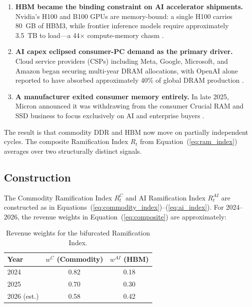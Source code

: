 \documentclass[12pt]{article}
\theoremstyle{definition}
\begin{document}
\begin{enumerate}[itemsep=4pt]
\item \textbf{HBM became the binding constraint on AI accelerator shipments.} Nvidia's H100 and B100 GPUs are memory-bound: a single H100 carries 80~GB of HBM3, while frontier inference models require approximately 3.5~TB to load---a 44$\times$ compute-memory chasm \cite{WakilPhotonic2026}.

\item \textbf{AI capex eclipsed consumer-PC demand as the primary driver.} Cloud service providers (CSPs) including Meta, Google, Microsoft, and Amazon began securing multi-year DRAM allocations, with OpenAI alone reported to have absorbed approximately 40\% of global DRAM production \cite{ColdFusion2026}.

\item \textbf{A manufacturer exited consumer memory entirely.} In late 2025, Micron announced it was withdrawing from the consumer Crucial RAM and SSD business to focus exclusively on AI and enterprise buyers \cite{ColdFusion2026}.
\end{enumerate}

The result is that commodity DDR and HBM now move on partially independent cycles. The composite Ramification Index $R_t$ from Equation~(\ref{eq:ram_index}) averages over two structurally distinct signals.

\subsection{Construction}

The Commodity Ramification Index $R_t^C$ and AI Ramification Index $R_t^{AI}$ are constructed as in Equations~(\ref{eq:commodity_index})--(\ref{eq:ai_index}). For 2024--2026, the revenue weights in Equation~(\ref{eq:composite}) are approximately:

\begin{table}[H]
\centering
\caption{Revenue weights for the bifurcated Ramification Index.}
\label{tab:weights}
\begin{tabular}{lcc}
\toprule
\textbf{Year} & $w^C$ (Commodity) & $w^{AI}$ (HBM) \\
\midrule
2024 & 0.82 & 0.18 \\
2025 & 0.70 & 0.30 \\
2026 (est.) & 0.58 & 0.42 \\
\bottomrule
\end{tabular}
\end{table}
\end{document}
